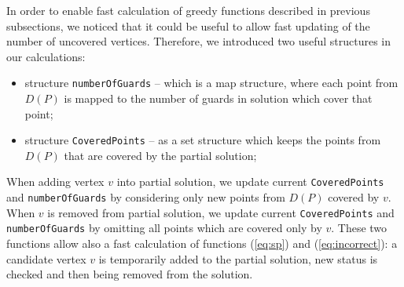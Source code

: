 \documentclass[runningheads,a4paper]{elsarticle}
\begin{document}
	In order to enable fast calculation of greedy functions described in previous subsections, we noticed that it could be useful to allow fast updating of the number of uncovered vertices. Therefore, we introduced two useful structures in our calculations: %
	\begin{itemize}
		\item structure \texttt{numberOfGuards} -- which is a map structure, where each point from $D(P)$ is mapped to the number of guards in solution which cover that point;
		\item structure \texttt{CoveredPoints} -- as a set structure which keeps the points from $D(P)$ that are covered by the partial solution;
	\end{itemize}
  When adding vertex $v$ into partial solution, we update current \texttt{CoveredPoints} and \texttt{numberOfGuards} by considering only new points from $D(P)$ covered by $v$.
  When $v$ is removed from partial solution, we update current \texttt{CoveredPoints} and \texttt{numberOfGuards} by omitting all points which are covered only by $v$.  These two functions allow also a fast calculation of  functions (\ref{eq:sp}) and  (\ref{eq:incorrect}): a candidate vertex $v$ is temporarily added to the partial solution, new status is checked and then being removed from the solution.


\end{document}
